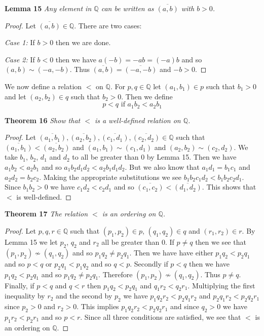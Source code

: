 \documentclass{article}
\begin{document}
\begin{flushleft}
\textbf{Lemma 15}
\textsl{Any element in $\mathbb{Q}$ can be written as $\overline{(a,b)}$ with $b>0$.}
\begin{proof}
Let $\overline{(a,b)} \in \mathbb{Q}$. There are two cases:\newline

\textsl{Case 1:} If $b>0$ then we are done.\newline

\textsl{Case 2:} If $b<0$ then we have $a(-b)=-ab=(-a)b$ and so $(a,b) \sim (-a,-b)$. Thus $\overline{(a,b)} = \overline{(-a,-b)}$ and $-b>0$.
\end{proof}

We now define a relation $<$ on $\mathbb{Q}$. For $p,q \in \mathbb{Q}$ let $(a_1,b_1) \in p$ such that $b_1>0$ and let $(a_2,b_2) \in q$ such that $b_2>0$. Then we define
\[
p<q \text{ if } a_1b_2<a_2b_1
\]

\textbf{Theorem 16}
\textsl{Show that $<$ is a well-defined relation on $\mathbb{Q}$.}
\begin{proof}
Let $\overline{(a_1,b_1)},\overline{(a_2,b_2)},\overline{(c_1,d_1)},\overline{(c_2,d_2)} \in \mathbb{Q}$ such that $\overline{(a_1,b_1)} < \overline{(a_2,b_2)}$ and $(a_1,b_1) \sim (c_1,d_1)$ and $(a_2,b_2) \sim (c_2,d_2)$. We take $b_1$, $b_2$, $d_1$ and $d_2$ to all be greater than $0$ by Lemma 15. Then we have $a_1b_2 < a_2b_1$ and so $a_1b_2d_1d_2 < a_2b_1d_1d_2$. But we also know that $a_1d_1=b_1c_1$ and $a_2d_2=b_2c_2$. Making the appropriate substitutions we see $b_1b_2c_1d_2 < b_1b_2c_2d_1$. Since $b_1b_2>0$ we have $c_1d_2<c_2d_1$ and so $\overline{(c_1,c_2)} < \overline{(d_1,d_2)}$. This shows that $<$ is well-defined.
\end{proof}

\textbf{Theorem 17}
\textsl{The relation $<$ is an ordering on $\mathbb{Q}$.}
\begin{proof}
Let $p,q,r \in \mathbb{Q}$ such that $(p_1,p_2) \in p$, $(q_1,q_2) \in q$ and $(r_1,r_2) \in r$. By Lemma 15 we let $p_2$, $q_2$ and $r_2$ all be greater than $0$. If $p \neq q$ then we see that $(p_1,p_2) \nsim (q_1,q_2)$ and so $p_1q_2 \neq p_2q_1$. Then we have have either $p_1q_2<p_2q_1$ and so $p<q$ or $p_2q_1<p_1q_2$ and so $q<p$. Secondly if $p<q$ then we have $p_1q_2<p_2q_1$ and so $p_1q_2 \neq p_2q_1$. Therefore $(p_1,p_2) \nsim (q_1,q_2)$. Thus $p \neq q$. Finally, if $p<q$ and $q<r$ then $p_1q_2<p_2q_1$ and $q_1r_2<q_2r_1$. Multiplying the first inequality by $r_2$ and the second by $p_2$ we have $p_1q_2r_2<p_2q_1r_2$ and $p_2q_1r_2<p_2q_2r_1$ since $p_2>0$ and $r_2>0$. This implies $p_1q_2r_2<p_2q_2r_1$ and since $q_2>0$ we have $p_1r_2<p_2r_1$ and so $p<r$. Since all three conditions are satisfied, we see that $<$ is an ordering on $\mathbb{Q}$.
\end{proof}


\end{flushleft}
\end{document}
